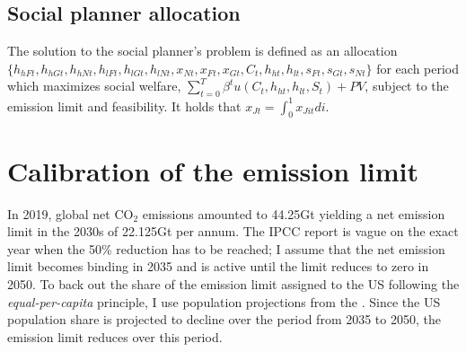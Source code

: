 \subsection{Social planner allocation}\label{app:sp_prob} The solution to the social planner's problem is defined as an allocation \\ $\{h_{hFt}, h_{hGt}, h_{hNt}, h_{lFt}, h_{lGt}, h_{lNt}, x_{Nt}, x_{Ft}, x_{Gt}, C_t,  h_{ht}, h_{lt}, s_{Ft}, s_{Gt}, s_{Nt} \}$ for each period which maximizes social welfare, $\sum_{t=0}^{T}\beta^t u(C_{t}, h_{ht}, h_{lt}, S_{t})+ PV$, subject to the emission limit and feasibility. 
It holds that $x_{Jt}=\int_{0}^{1}x_{Jit}di$.

\section{Calibration of the emission limit}\label{app:calib}
In 2019, global net CO$_2$ emissions amounted to 44.25Gt \citep[compare Figure SPM1.a p.11 in ][]{IPCCSPM} yielding a net emission limit in the 2030s of 22.125Gt per annum. The IPCC report is vague on the exact year when the 50\% reduction has to be reached; I assume that the net emission limit becomes binding in 2035 and is active until the limit reduces to zero in 2050. 
To back out the share of the emission limit assigned to the US following the \textit{equal-per-capita} principle, I use population projections from the \cite{UNPOP}. %
Since the US population share is projected to decline over the period from 2035 to 2050, the emission limit reduces over this period. 

